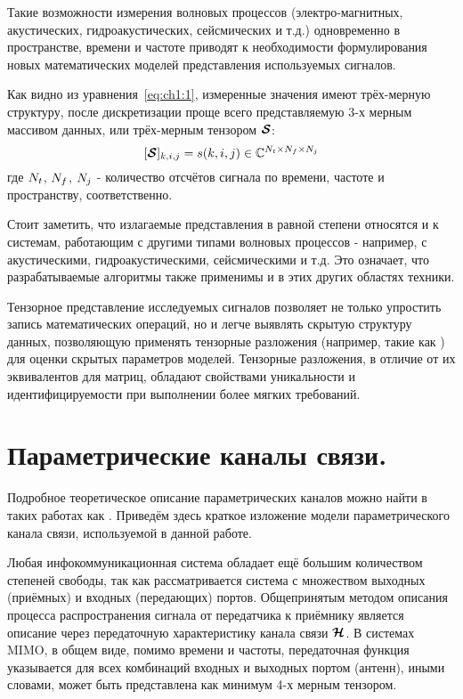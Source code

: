 Такие возможности измерения волновых процессов (электро-магнитных, акустических, гидроакустических, сейсмических и т.д.) одновременно в пространстве, времени и частоте приводят к необходимости формулирования новых математических моделей представления используемых сигналов.

Как видно из уравнения~\eqref{eq:ch1:1}, измеренные значения имеют трёх-мерную структуру, после дискретизации проще всего представляемую 3-х мерным массивом данных, или трёх-мерным тензором $\boldsymbol{\mathcal S}$:
\begin{equation}
\label{eq:ch1:2}
[\boldsymbol{\mathcal S}]_{k,i,j}=s(k,i,j)\in\mathbb{C}^{N_t\times N_f \times N_j}
\end{equation}
где $N_t$, $N_f$, $N_j$ - количество отсчётов сигнала по времени, частоте и пространству, соответственно.

Стоит заметить, что излагаемые представления в равной степени относятся и к системам, работающим с другими типами волновых процессов - например, с акустическими, гидроакустическими, сейсмическими и т.д. Это означает, что разрабатываемые алгоритмы также применимы и в этих других областях техники.

Тензорное представление исследуемых сигналов позволяет не только упростить запись математических операций, но и легче выявлять скрытую структуру данных, позволяющую применять тензорные разложения (например, такие как \cite{Bros99, Roemer12, Roemer13}) для оценки скрытых параметров моделей. Тензорные разложения, в отличие от их эквивалентов для матриц, обладают свойствами уникальности и идентифицируемости при выполнении более мягких требований.

\section{Параметрические каналы связи.}\label{sec:ch1/sec2}

Подробное теоретическое описание параметрических каналов можно найти в таких работах как \cite{Richter2005}. Приведём здесь краткое изложение модели параметрического канала связи, используемой в данной работе.

Любая инфокоммуникационная система обладает ещё большим количеством степеней свободы, так как рассматривается система с множеством выходных (приёмных) и входных (передающих) портов. Общепринятым методом описания процесса распространения сигнала от передатчика к приёмнику является описание через передаточную характеристику канала связи $\boldsymbol{\mathcal H}$. В системах MIMO, в общем виде, помимо времени и частоты, передаточная функция указывается для всех комбинаций входных и выходных портом (антенн), иными словами, может быть представлена как минимум 4-х мерным тензором.

